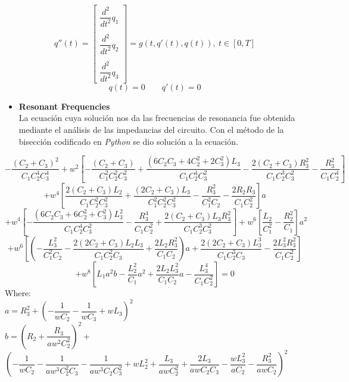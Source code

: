 \documentclass[10pt,a4paper]{article}
\begin{document}
	$$q''(t) = \left[ \begin{array}{l} 
		\dfrac{d^2}{dt^2} q_1 \\\\ 
		\dfrac{d^2}{dt^2} q_2 \\\\ 
		\dfrac{d^2}{dt^2} q_3
	\end{array}
	\right] = g(t, q'(t), q(t)), \ t \in [0, T]$$
	$$q(t) = 0 \qquad q'(t) = 0$$
\begin{multicols}{2}
\begin{itemize}
\item \textbf{Resonant Frequencies}\\
La ecuación cuya solución nos da las frecuencias de resonancia fue obtenida mediante el análisis de las impedancias del circuito. Con el método de la bisección codificado en \textit{Python} se dio solución a la ecuación.
\end{itemize}
\end{multicols}
\[
-\dfrac{(C_2+C_3)^2}{C_1C_2^4C_3^4} + w^2 \left[ - \dfrac{(C_2+C_3)}{C_1^2C_2^2C_3^2} + \dfrac{(6C_2C_3+4C_2^2+2C_3^2)L_3}{C_1C_2^4C_3^2} - \dfrac{2(C_2+C_3)R_3^2}{C_1C_2^3C_3^2} - \dfrac{R_3^2}{C_1C_2^4} \right]
\]
\[
+ w^4 \left[ \dfrac{2(C_2+C_3)L_2}{C_1C_2^2C_3^2} + \dfrac{(2C_2+C_3)L_3}{C_1^2C_2^2C_3^2} - \dfrac{R_3^2}{C_1^2C_2} - \dfrac{2R_2R_3}{C_1C_2^2} \right] a
\]
\[
+ w^4 \left[ - \dfrac{(6C_2C_3+6C_2^2+C_3^2)L_3^2}{C_1C_2^4C_3^2} - \dfrac{R_3^4}{C_1C_2^2} + \dfrac{2(C_2+C_3)L_3R_3^2}{C_1C_2^3C_3^2} \right] + w^6 \left[ \dfrac{L_2}{C_1^2} - \dfrac{R_2^2}{C_1} \right] a^2 
\]
\[
+ w^6 \left[ \left( - \dfrac{L_3^2}{C_1^2C_2} - \dfrac{2(2C_2+C_3)L_2L_3}{C_1C_2^2C_3} + \dfrac{2L_2R_3^2}{C_1C_2} \right) a + \dfrac{2(2C_2+C_3)L_3^3}{C_1C_2^3C_3} - \dfrac{2L_3^2R_3^2}{C_1C_2^2} \right]
\]
\[
+ w^8 \left[ L_1a^2b - \dfrac{L_2^2}{C_1} a^2 + \dfrac{2L_2L_3^2}{C_1C_2} a - \dfrac{L_3^4}{C_1C_2^2} \right] = 0
\]
Where:\\

$
a = R_3^2 + \left( - \dfrac{1}{wC_2} - \dfrac{1}{wC_3} + wL_3 \right)^2
$\\

$
b = \left( R_2 + \dfrac{R_3}{aw^2C_2^2} \right)^2 +
$\\
$
\left( - \dfrac{1}{wC_2} - \dfrac{1}{aw^3C_2^2C_3} - \dfrac{1}{aw^3C_2C_3^2} + wL_2^2 + \dfrac{L_3}{awC_2^2} + \dfrac{2L_3}{awC_2C_3} - \dfrac{wL_3^2}{aC_2} - \dfrac{R_3^2}{awC_2} \right)^2
$
\end{document}
